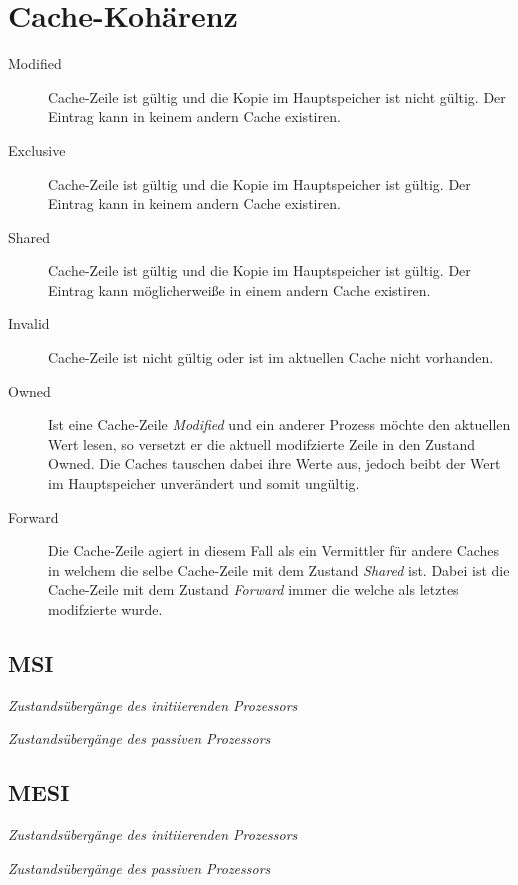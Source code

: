 \section{Cache-Kohärenz}
\begin{description}
 \item[Modified] Cache-Zeile ist gültig und die Kopie im Hauptspeicher ist nicht
 gültig. Der Eintrag kann in keinem andern Cache existiren.
 \item[Exclusive] Cache-Zeile ist gültig und die Kopie im Hauptspeicher ist gültig.
 Der Eintrag kann in keinem andern Cache existiren.
 \item[Shared] Cache-Zeile ist gültig und die Kopie im Hauptspeicher ist gültig.
 Der Eintrag kann möglicherweiße in einem andern Cache existiren.
 \item[Invalid] Cache-Zeile ist nicht gültig oder ist im aktuellen Cache nicht vorhanden.
 \item[Owned] Ist eine Cache-Zeile \textit{Modified} und ein anderer Prozess möchte den 
 aktuellen Wert lesen, so versetzt er die aktuell modifzierte Zeile in den Zustand Owned.
 Die Caches tauschen dabei ihre Werte aus, jedoch beibt der Wert im Hauptspeicher
 unverändert und somit ungültig.
 \item[Forward] Die Cache-Zeile agiert in diesem Fall als ein Vermittler für andere Caches
 in welchem die selbe Cache-Zeile mit dem Zustand \textit{Shared} ist. Dabei ist die 
 Cache-Zeile mit dem Zustand \textit{Forward} immer die welche als letztes modifzierte 
 wurde.
\end{description}

\subsection{MSI}
\begin{minipage}{\linewidth}
\centering

{\small\textit{Zustandsübergänge des initiierenden Prozessors}}

{\small\textit{Zustandsübergänge des passiven Prozessors}}
\end{minipage}

\subsection{MESI}
\begin{minipage}{\linewidth}
\centering

{\small\textit{Zustandsübergänge des initiierenden Prozessors}}

{\small\textit{Zustandsübergänge des passiven Prozessors}}
\end{minipage}

